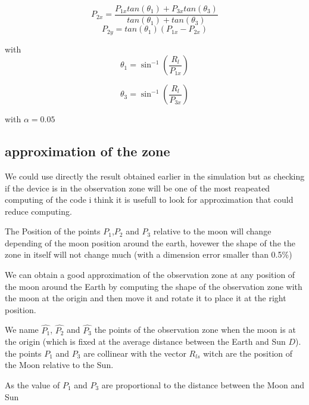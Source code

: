 \documentclass[11pt]{article} %
\begin{document}
		$$
		P_{2x}=\frac{P_{1x}tan(\theta_1) + P_{3x}tan(\theta_3)}{tan(\theta_1) + tan(\theta_3)}
		$$
		$$
		P_{2y}=tan(\theta_1)(P_{1x}-P_{2x})
		$$
		
		with
		$$
		\theta_1=\sin^{-1}\left(\frac{R_l}{P_{1x}}\right)
		$$
		
		$$
		\theta_3=\sin^{-1}\left(\frac{R_l}{P_{3x}}\right)
		$$
		
		with $\alpha=0.05$
		
		\subsection{approximation of the zone}
		
		We could use directly the result obtained earlier in the simulation but as checking if the device is in the observation zone will be one of the most reapeated computing of the code i think it is usefull to look for approximation that could reduce computing.
		
		The Position of the points $P_1$,$P_2$ and $P_3$ relative to the moon will change depending of the moon position around the earth, hovewer the shape of the the zone in itself will not change much (with a dimension error smaller than 0.5\%)
		
		
		We can obtain a good approximation of the observation zone at any position of the moon around the Earth by computing the shape of the observation zone with the moon at the origin and then move it and rotate it to place it at the right position.
		
		
		
		We name $\hat{P_1}$, $\hat{P_2}$ and $\hat{P_3}$ the points of the observation zone when the moon is at the origin (which is fixed at the average distance between the Earth and Sun $D$). the points $P_1$ and $P_3$ are collinear with the vector $R_{ls}$ witch are the position of the Moon relative to the Sun.
		
		As the value of $P_1$ and $P_3$ are proportional to the distance between the Moon and Sun 
		
\end{document}
